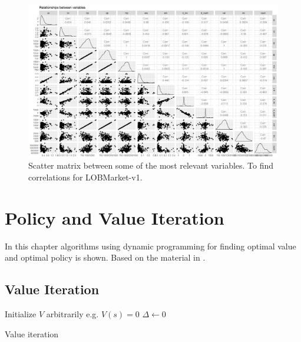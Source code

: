 \documentclass{kththesis}
\theoremstyle{definition}
\begin{document}
 \begin{figure}
\centering
\includegraphics[scale=.6]{scatter_mat_vars.png}
\caption{Scatter matrix between some of the most relevant variables. To find correlations for LOBMarket-v1. }
\label{fig:cc2}
\end{figure}   




\chapter{Policy and Value Iteration}\label{app:A}
In this chapter algorithms using dynamic programming for finding optimal value and optimal policy is shown. Based on the material in \parencite{sutton1998reinforcement}.

\section{Value Iteration}
\LinesNumbered
\begin{algorithm}[H]
 \textsf{Initialize $V$ arbitrarily e.g. $V(s) = 0$} \;
 $\Delta \leftarrow 0$ \;
 \caption{Value iteration}
 \label{alg2}
\end{algorithm}
\end{document}
